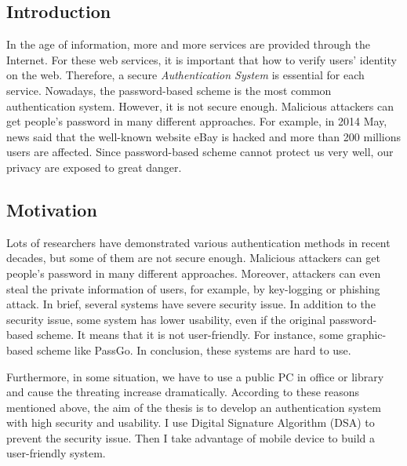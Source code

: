 
\begin{CJK}{Bg5}{bsmi}



\chapter{Introduction}

In the age of information, more and more services are provided through the Internet. For these web services, it is important that how to verify users' identity on the web. Therefore, a secure \emph{Authentication System} is essential for each service. Nowadays, the password-based scheme is the most common authentication system. However, it is not secure enough\cite{password-security}. Malicious attackers can get people's password in many different approaches. For example, in 2014 May, news said that the well-known website eBay is hacked and more than 200 millions users are affected\cite{ebay-hack}. Since password-based scheme cannot protect us very well, our privacy are exposed to great danger.

\section{Motivation}

Lots of researchers have demonstrated various authentication methods in recent decades, but some of them are not secure enough. Malicious attackers can get people's password in many different approaches. Moreover, attackers can even steal the private information of users, for example, by key-logging or phishing attack. In brief, several systems have severe security issue. In addition to the security issue, some system has lower usability, even if the original password-based scheme\cite{password-usability}. It means that it is not user-friendly. For instance, some graphic-based scheme like PassGo\cite{passgo}. In conclusion, these systems are hard to use.

Furthermore, in some situation, we have to use a public PC in office or library and cause the threating increase dramatically. According to these reasons mentioned above, the aim of the thesis is to develop an authentication system with high security and usability. I use Digital Signature Algorithm (DSA) to prevent the security issue. Then I take advantage of mobile device to build a user-friendly system.


\end{CJK}

